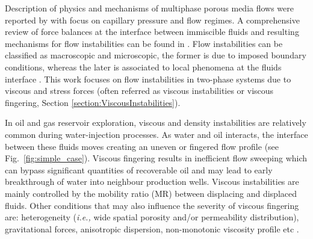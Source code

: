 \documentclass[preprint,authoryear,12pt]{elsarticle}
\newcommand{\red}{\textcolor{red}}
\newcommand{\eg}{{\it e.g., }}
\newcommand{\ie}{{\it i.e., }}
\begin{document}
\medskip
Description of physics and mechanisms of multiphase porous media flows were reported by \citet{wooding_1976} with focus on capillary pressure and flow regimes. A comprehensive review of force balances at the interface between immiscible fluids and resulting mechanisms for flow instabilities can be found in \citet{homsy_1987}. Flow instabilities can be classified as macroscopic and microscopic, the former is due to imposed boundary conditions, whereas the later is associated to local phenomena at the fluids interface \citep[\eg Kelvin-Helmholtz and Saffman-Taylor instabilities,][]{saffman_1959}. This work focuses on flow instabilities in two-phase systems due to viscous and stress forces (often referred as viscous instabilities or viscous fingering, Section \ref{section:ViscousInstabilities}).

\medskip
In oil and gas reservoir exploration, viscous and density instabilities are relatively common during water-injection processes. As water and oil interacts, the interface between these fluids moves creating an uneven or fingered flow profile (see Fig.~\ref{fig:simple_case}). Viscous fingering results in inefficient flow sweeping which can bypass significant quantities of recoverable oil and may lead to early breakthrough of water into neighbour production wells. Viscous instabilities are mainly controlled by the mobility ratio (MR) between displacing and displaced fluids. Other conditions that may also influence the severity of viscous fingering are: heterogeneity (\ie wide spatial porosity and/or permeability distribution), gravitational forces, anisotropic dispersion, non-monotonic viscosity profile etc \citep{budek_2017,nicolaides_2015}.
\end{document}
